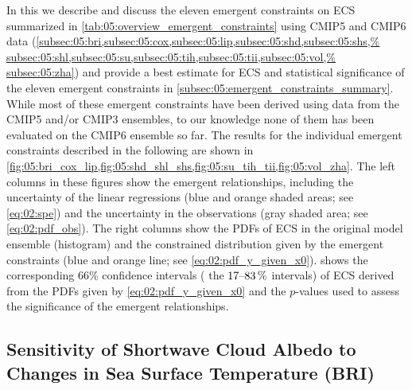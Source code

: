 In this  we describe and
discuss the eleven emergent constraints on \ac{ECS} summarized in
\cref{tab:05:overview_emergent_constraints} using \acs{CMIP}5 and \acs{CMIP}6
data
(\cref{subsec:05:bri,subsec:05:cox,subsec:05:lip,subsec:05:shd,subsec:05:shs,%
  subsec:05:shl,subsec:05:su,subsec:05:tih,subsec:05:tii,subsec:05:vol,%
  subsec:05:zha}) and provide a best estimate for \ac{ECS} and statistical
significance of the eleven emergent constraints in
\cref{subsec:05:emergent_constraints_summary}. While most of these emergent
constraints have been derived using data from the \acs{CMIP}5 and/or
\acs{CMIP}3 ensembles, to our knowledge none of them has been evaluated on
the \acs{CMIP}6 ensemble so far. The results for the individual emergent
constraints described in the following are shown in
\cref{fig:05:bri_cox_lip,fig:05:shd_shl_shs,fig:05:su_tih_tii,fig:05:vol_zha}.
The left columns in these figures show the emergent relationships, including
the uncertainty of the linear regressions (blue and orange shaded areas; see
\cref{eq:02:spe}) and the uncertainty in the observations (gray shaded area;
see \cref{eq:02:pdf_obs}). The right columns show the \acp{PDF} of \ac{ECS} in
the original model ensemble (histogram) and the constrained distribution given
by the emergent constraints (blue and orange line; see
\cref{eq:02:pdf_y_given_x0}).  shows the
corresponding $66 \unit{\%}$ confidence intervals (\ie{} the
$\rangeunit{17}{83}{\%}$ intervals) of \ac{ECS} derived from the \acp{PDF}
given by \cref{eq:02:pdf_y_given_x0} and the $p$-values used to assess the
significance of the emergent relationships.


\subsection{Sensitivity of Shortwave Cloud Albedo to Changes in Sea Surface
  Temperature (BRI)}
\label{subsec:05:bri}

